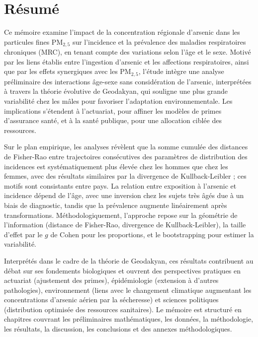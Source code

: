 \section{Résumé}

Ce mémoire examine l'impact de la concentration régionale d'arsenic dans les particules fines PM$_{2{,}5}$ sur l'incidence et la prévalence des maladies respiratoires chroniques (MRC), en tenant compte des variations selon l'âge et le sexe. Motivé par les liens établis entre l'ingestion d'arsenic et les affections respiratoires, ainsi que par les effets synergiques avec les PM$_{2{,}5}$, l'étude intègre une analyse préliminaire des interactions âge-sexe sans considération de l'arsenic, interprétées à travers la théorie évolutive de Geodakyan, qui souligne une plus grande variabilité chez les mâles pour favoriser l'adaptation environnementale. Les implications s'étendent à l'actuariat, pour affiner les modèles de primes d'assurance santé, et à la santé publique, pour une allocation ciblée des ressources.

Sur le plan empirique, les analyses révèlent que la somme cumulée des distances de Fisher-Rao entre trajectoires consécutives des paramètres de distribution des incidences est systématiquement plus élevée chez les hommes que chez les femmes, avec des résultats similaires par la divergence de Kullback-Leibler ; ces motifs sont consistants entre pays. La relation entre exposition à l'arsenic et incidence dépend de l'âge, avec une inversion chez les sujets très âgés due à un biais de diagnostic, tandis que la prévalence augmente linéairement après transformations. Méthodologiquement, l'approche repose sur la géométrie de l'information (distance de Fisher-Rao, divergence de Kullback-Leibler), la taille d'effet par le \( g \) de Cohen pour les proportions, et le bootstrapping pour estimer la variabilité.

Interprétés dans le cadre de la théorie de Geodakyan, ces résultats contribuent au débat sur ses fondements biologiques et ouvrent des perspectives pratiques en actuariat (ajustement des primes), épidémiologie (extension à d'autres pathologies), environnement (liens avec le changement climatique augmentant les concentrations d'arsenic aérien par la sécheresse) et sciences politiques (distribution optimisée des ressources sanitaires). Le mémoire est structuré en chapitres couvrant les préliminaires mathématiques, les données, la méthodologie, les résultats, la discussion, les conclusions et des annexes méthodologiques.